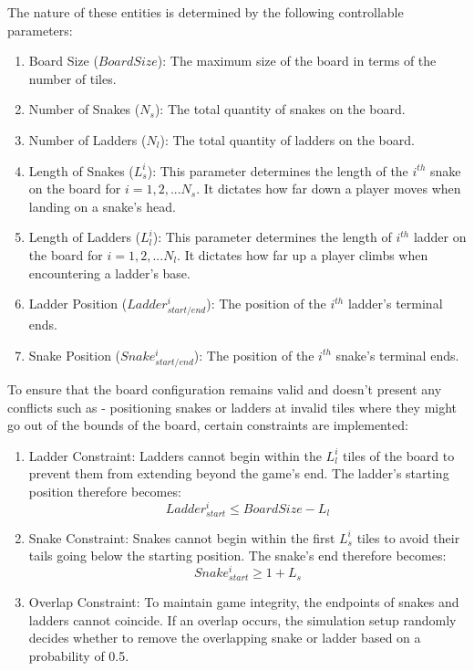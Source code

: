 \documentclass[12pt]{report}
\begin{document}
	The nature of these entities is determined by the following controllable parameters:
	\begin{enumerate}
		\item Board Size ($BoardSize$): The maximum size of the board in terms of the number of tiles.
		\item Number of Snakes ($N_{s}$): The total quantity of snakes on the board.
		\item Number of Ladders ($N_{l}$): The total quantity of ladders on the board.
		\item Length of Snakes ($L^{i}_{s}$): This parameter determines the length of the $i^{th}$ snake on the board for $i=1,2,... N_{s}$. It dictates how far down a player moves when landing on a snake's head.
		\item Length of Ladders ($L^{i}_{l}$): This parameter determines the length of $i^{th}$ ladder on the board for $i=1,2,... N_{l}$. It dictates how far up a player climbs when encountering a ladder's base.
		\item Ladder Position ($Ladder^{i}_{start/end}$): The position of the $i^{th}$ ladder's terminal ends.
		\item Snake Position ($Snake^{i}_{start/end}$): The position of the $i^{th}$ snake's terminal ends.
	\end{enumerate}
	
	To ensure that the board configuration remains valid and doesn't present any conflicts such as - positioning snakes or ladders at invalid tiles where they might go out of the bounds of the board, certain constraints are implemented:
	
	\begin{enumerate}
		\item Ladder Constraint: Ladders cannot begin within the $L^{i}_{l}$ tiles of the board to prevent them from extending beyond the game's end. The ladder's starting position therefore becomes:  $$Ladder^{i}_{start} \leq BoardSize - L_{l}$$
		\item Snake Constraint: Snakes cannot begin within the first $L^{i}_{s}$ tiles to avoid their tails going below the starting position. The snake's end therefore becomes: $$Snake^{i}_{start}\geq 1 + L_{s}$$
		\item Overlap Constraint: To maintain game integrity, the endpoints of snakes and ladders cannot coincide. If an overlap occurs, the simulation setup randomly decides whether to remove the overlapping snake or ladder based on a probability of 0.5.
	\end{enumerate}
	
	
\end{document}
